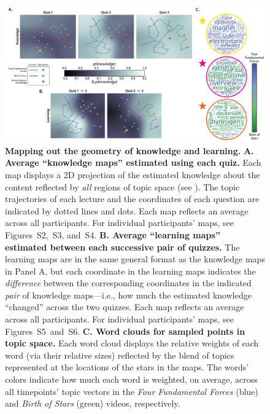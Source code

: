 \documentclass[10pt]{article}
\newcommand{\individualKnowledgeMapsA}{S2}
\newcommand{\individualKnowledgeMapsB}{S3}
\newcommand{\individualKnowledgeMapsC}{S4}
\newcommand{\individualLearningMapsA}{S5}
\newcommand{\individualLearningMapsB}{S6}
\renewcommand{\nameref}[1]{\mbox{\textit{\oldnameref{#1}}}}
\begin{document}
\begin{figure}[tp]
    \centering
    \includegraphics[width=\textwidth]{figs/knowledge_and_learning_maps}

    \caption{\textbf{Mapping out the geometry of knowledge and learning.}
    \textbf{A. Average ``knowledge maps'' estimated using each quiz.} Each map
    displays a 2D projection of the estimated knowledge about the content
    reflected by \textit{all} regions of topic space (see
    \nameref{subsec:knowledge-maps}). The topic trajectories of each
    lecture and the coordinates of each question are indicated by dotted lines
    and dots. Each map reflects an average across all participants. For
    individual participants' maps, see
    Figures~\individualKnowledgeMapsA,~\individualKnowledgeMapsB,
    and~\individualKnowledgeMapsC. \textbf{B. Average ``learning maps''
    estimated between each successive pair of quizzes.} The learning maps are
    in the same general format as the knowledge maps in Panel A, but each
    coordinate in the learning maps indicates the \textit{difference} between
    the corresponding coordinates in the indicated \textit{pair} of knowledge
    maps---i.e., how much the estimated knowledge ``changed'' across the two
    quizzes. Each map reflects an average across all participants. For
    individual participants' maps, see
    Figures~\individualLearningMapsA~and~\individualLearningMapsB. \textbf{C.
    Word clouds for sampled points in topic space.} Each word cloud displays
    the relative weights of each word (via their relative sizes) reflected by the blend of topics
    represented at the locations of the stars in the maps. The words' colors
    indicate how much each word is weighted, on average, across all timepoints'
    topic vectors in the \textit{Four Fundamental Forces} (blue) and
    \textit{Birth of Stars} (green) videos, respectively.}

    \label{fig:knowledge-maps}
    \end{figure}
\end{document}
